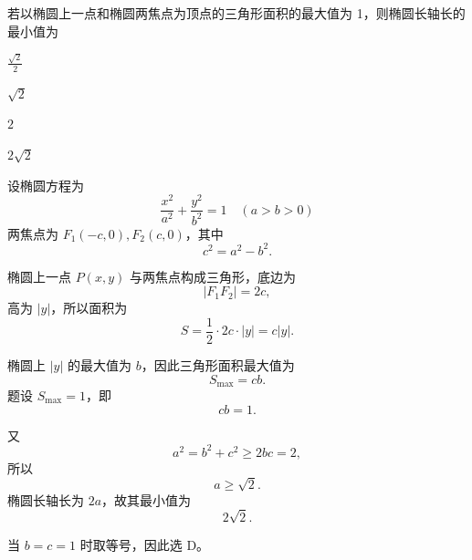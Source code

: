 \begin{question}
若以椭圆上一点和椭圆两焦点为顶点的三角形面积的最大值为 1，则椭圆长轴长的最小值为 \paren[D]
\begin{choices}
  \item $\frac{\sqrt{2}}{2}$
  \item $\sqrt{2}$
  \item $2$
  \item $2\sqrt{2}$
\end{choices}
\begin{solution}
设椭圆方程为
\[
\frac{x^2}{a^2}+\frac{y^2}{b^2}=1\quad (a>b>0)
\]
两焦点为 $F_1(-c,0),F_2(c,0)$，其中
\[
c^2=a^2-b^2.
\]

椭圆上一点 $P(x,y)$ 与两焦点构成三角形，底边为
\[
|F_1F_2|=2c,
\]
高为 $|y|$，所以面积为
\[
S=\frac12\cdot 2c\cdot |y|=c|y|.
\]

椭圆上 $|y|$ 的最大值为 $b$，因此三角形面积最大值为
\[
S_{\max}=cb.
\]
题设 $S_{\max}=1$，即
\[
cb=1.
\]

又
\[
a^2=b^2+c^2\ge 2bc=2,
\]
所以
\[
a\ge \sqrt2.
\]
椭圆长轴长为 $2a$，故其最小值为
\[
2\sqrt2.
\]

当 $b=c=1$ 时取等号，因此选 D。
\end{solution}
\end{question}


